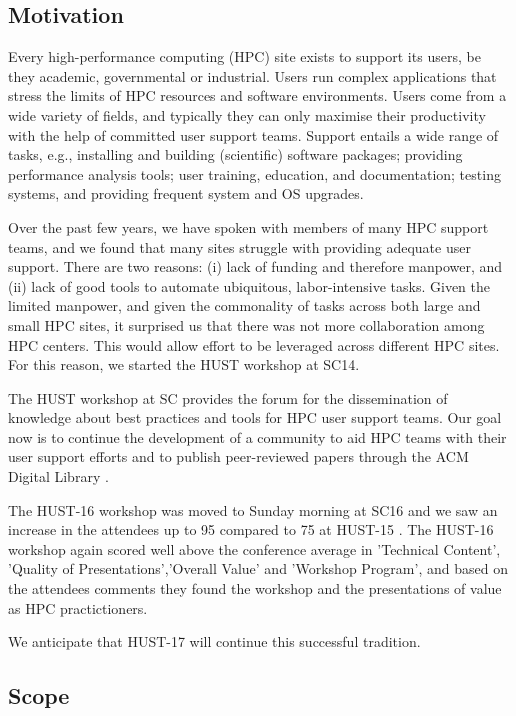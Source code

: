 \documentclass[a4paper,10pt]{article}
\begin{document}
\subsection*{Motivation}
\label{sec:motivation}

Every high-performance computing (HPC) site exists to support its users,
be they academic, governmental or industrial.  Users run complex applications
that stress the limits of HPC resources and software environments.
Users come from a wide variety of fields,
and typically they can only maximise their productivity with the help of
committed user support teams.  Support entails a wide range
of tasks, e.g., installing and building (scientific) software packages; providing
performance analysis tools; user training, education, and documentation; testing
systems, and providing frequent system and OS upgrades.

Over the past few years, we have spoken with members of many HPC support teams,
and we found that many sites struggle with providing adequate user support.  
There are two reasons: (i) lack of funding and therefore manpower, and
(ii) lack of good tools to automate ubiquitous, labor-intensive tasks.
%
Given the limited manpower, and given the commonality of tasks across both large
and small HPC sites, it surprised us that there was not more collaboration among
HPC centers.  This would allow effort to be leveraged across different HPC sites.
For this reason, we started the HUST workshop at SC14.                                                              

The HUST workshop at SC provides the forum for the 
dissemination of knowledge about best practices and tools for HPC user support teams. 
Our goal now is to continue the development of a community to aid HPC teams 
with their user support efforts and to publish peer-reviewed papers through the ACM Digital Library \cite{H14} \cite{H15} \cite{H16}
. 

The HUST-16 workshop was moved to Sunday morning at SC16 and we saw an increase in the attendees up to 95 compared to 75 at HUST-15 .  The HUST-16 workshop again scored well above the conference average in 'Technical Content', 'Quality of Presentations','Overall Value' and 'Workshop Program', and based on the attendees comments they found the workshop and the presentations of value as HPC practictioners. 

We anticipate that HUST-17 will continue this successful tradition.

\subsection*{Scope}
\label{sec:scope}
\end{document}
